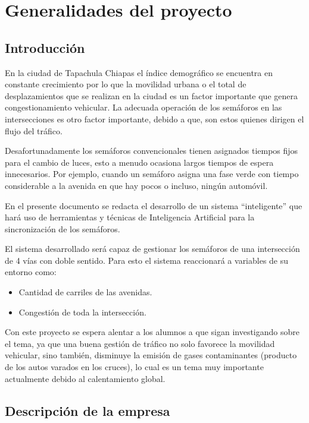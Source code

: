 \chapter{Generalidades del proyecto}

\section{Introducción}

En la ciudad de Tapachula Chiapas el índice demográfico se encuentra en constante crecimiento por lo que la movilidad urbana o el total de desplazamientos que se realizan en la ciudad es un factor importante que genera congestionamiento vehicular. La adecuada operación de los semáforos en las intersecciones es otro factor importante, debido a que, son estos quienes dirigen el flujo del tráfico.

Desafortunadamente los semáforos convencionales tienen asignados tiempos fijos para el cambio de luces, esto a menudo ocasiona largos tiempos de espera innecesarios. Por ejemplo, cuando un semáforo asigna una fase verde con tiempo considerable a la avenida en que hay pocos o incluso, ningún automóvil.

En el presente documento se redacta el desarrollo de un sistema “inteligente” que hará uso de herramientas y técnicas de Inteligencia Artificial para la sincronización de los semáforos.

El sistema desarrollado será capaz de gestionar los semáforos de una intersección de 4 vías con doble sentido. Para esto el sistema reaccionará a variables de su entorno como:

{\setlength{\baselineskip}{0.7\baselineskip}
\begin{itemize}
	\item Cantidad de carriles de las avenidas.
	\item Congestión de toda la intersección.
\end{itemize}}

Con este proyecto se espera alentar a los alumnos a que sigan investigando sobre el tema, ya que una buena gestión de tráfico no solo favorece la movilidad vehicular, sino también, disminuye la emisión de gases contaminantes (producto de los autos varados en los cruces), lo cual es un tema muy importante actualmente debido al calentamiento global.

\section{Descripción de la empresa}

